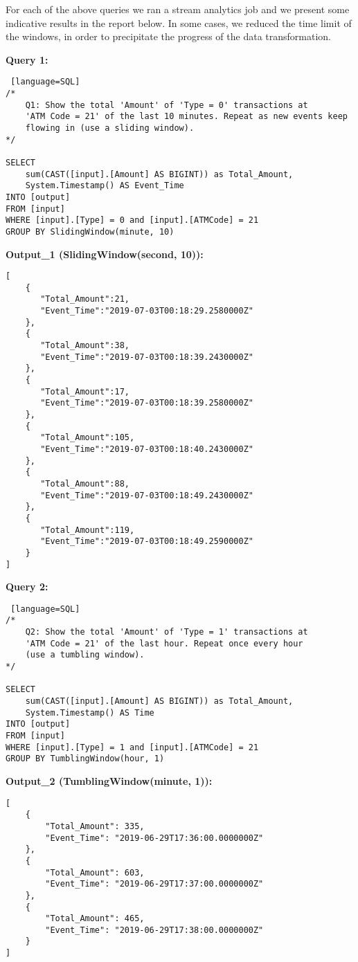 \documentclass[12pt]{report}
\begin{document}
{\noindent For each of the above queries we ran a stream analytics job and we present some indicative results in the report below. In some cases, we reduced the time limit of the windows, in order to precipitate the progress of the data transformation. 

\newpage

\textbf{Query 1:}


\begin{lstlisting} [language=SQL]
/*
    Q1: Show the total 'Amount' of 'Type = 0' transactions at
    'ATM Code = 21' of the last 10 minutes. Repeat as new events keep
    flowing in (use a sliding window).
*/

SELECT
    sum(CAST([input].[Amount] AS BIGINT)) as Total_Amount, 
    System.Timestamp() AS Event_Time
INTO [output]
FROM [input]
WHERE [input].[Type] = 0 and [input].[ATMCode] = 21
GROUP BY SlidingWindow(minute, 10)

\end{lstlisting}

\bigbreak

\noindent \textbf{Output\_1 (SlidingWindow(second, 10)): }

\begin{lstlisting}
[
	{  
	   "Total_Amount":21,
	   "Event_Time":"2019-07-03T00:18:29.2580000Z"
	},
	{  
	   "Total_Amount":38,
	   "Event_Time":"2019-07-03T00:18:39.2430000Z"
	},
	{  
	   "Total_Amount":17,
	   "Event_Time":"2019-07-03T00:18:39.2580000Z"
	},
	{  
	   "Total_Amount":105,
	   "Event_Time":"2019-07-03T00:18:40.2430000Z"
	},
	{  
	   "Total_Amount":88,
	   "Event_Time":"2019-07-03T00:18:49.2430000Z"
	},
	{  
	   "Total_Amount":119,
	   "Event_Time":"2019-07-03T00:18:49.2590000Z"
	}
]
\end{lstlisting}


\noindent \textbf{Query 2:}
\begin{lstlisting} [language=SQL]
/*
    Q2: Show the total 'Amount' of 'Type = 1' transactions at 
    'ATM Code = 21' of the last hour. Repeat once every hour 
    (use a tumbling window).
*/

SELECT
    sum(CAST([input].[Amount] AS BIGINT)) as Total_Amount, 
    System.Timestamp() AS Time
INTO [output]
FROM [input]
WHERE [input].[Type] = 1 and [input].[ATMCode] = 21
GROUP BY TumblingWindow(hour, 1)

\end{lstlisting}
\bigbreak
\noindent \textbf{Output\_2 (TumblingWindow(minute, 1)): }
\begin{lstlisting}
[
	{
		"Total_Amount": 335,
		"Event_Time": "2019-06-29T17:36:00.0000000Z"
	},
	{
		"Total_Amount": 603,
		"Event_Time": "2019-06-29T17:37:00.0000000Z"
	},
	{
		"Total_Amount": 465,
		"Event_Time": "2019-06-29T17:38:00.0000000Z"
	}
]
\end{lstlisting}

}
\end{document}

